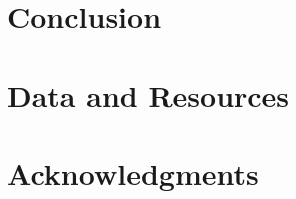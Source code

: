 \documentclass[12pt,titlepage]{article}
\begin{document}
\section{Conclusion }


\section{Data and Resources }


\section{Acknowledgments }


\newpage
%
%

\newpage

\newpage

\end{document}
